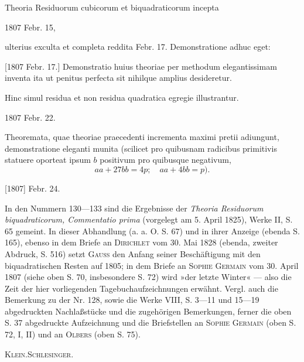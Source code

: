 \noindent\hspace*{\parindent}Theoria Residuorum cubicorum et biquadraticorum incepta
\par\noindent\hfill 1807 Febr. 15,

\noindent ulterius exculta et completa reddita Febr. 17. Demonstratione adhuc eget:
\par\noindent\hfill [1807 Febr. 17.]
\clearpage{}
\noindent\hspace*{\parindent}Demonstratio huius theoriae per methodum elegantissimam inventa ita ut penitus perfecta sit nihilque amplius desideretur.
\par\noindent\hspace*{\parindent}Hinc simul residua et non residua quadratica egregie illustrantur.
\par\noindent\hfill 1807 Febr. 22.

\noindent\hspace*{\parindent}Theoremata, quae theoriae praecedenti incrementa maximi pretii adiungunt, demonstratione eleganti munita (scilicet pro quibusnam radicibus primitivis statuere oporteat ipsum \(b\) positivum pro quibusque negativum,
\[
aa+27bb=4p;\quad aa+4bb=p).
\]
\par\noindent\hfill [1807] Febr. 24.
\par\medskip\begingroup\small
\noindent\hspace*{\parindent}In den Nummern 130—133 sind die Ergebnisse der \textit{Theoria Residuorum biquadraticorum, Commentatio prima} (vorgelegt am 5. April 1825), Werke II, S. 65 gemeint. In dieser Abhandlung (a. a. O. S. 67) und in ihrer Anzeige (ebenda S. 165), ebenso in dem Briefe an \textsc{Dirichlet} vom 30. Mai 1828 (ebenda, zweiter Abdruck, S. 516) setzt \textsc{Gauss} den Anfang seiner Beschäftigung mit den biquadratischen Resten auf 1805; in dem Briefe an \textsc{Sophie Germain} vom 30. April 1807 (siehe oben S. 70, insbesondere S. 72) wird »der letzte Winter« — also die Zeit der hier vorliegenden Tagebuchaufzeichnungen erwähnt. Vergl. auch die Bemerkung zu der Nr. 128, sowie die Werke VIII, S. 3—11 und 15—19 abgedruckten Nachlaßstücke und die zugehörigen Bemerkungen, ferner die oben S. 37 abgedruckte Aufzeichnung und die Briefstellen an \textsc{Sophie Germain} (oben S. 72, I, II) und an \textsc{Olbers} (oben S. 75).
\par\noindent\hfill\textsc{Klein.\quad Schlesinger.}
\par\endgroup
